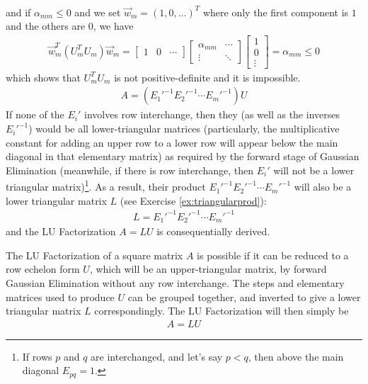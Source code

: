 {\begin{align*}
\end{align*}
and if $\alpha_{mm} \leq 0$ and we set $\vec{w}_{m} = (1,0,\ldots)^T$ where only the first component is $1$ and the others are $0$, we have
\begin{align*}
\vec{w}_{m}^T(U_m^T U_m)\vec{w}_{m} =
\begin{bmatrix}
1 & 0 & \cdots 
\end{bmatrix}
\begin{bmatrix}
\alpha_{mm} & \cdots \\
\vdots & \ddots
\end{bmatrix}
\begin{bmatrix}
1 \\
0 \\
\vdots
\end{bmatrix}
= \alpha_{mm} \leq 0
\end{align*}
which shows that $U_{m}^T U_{m}$ is not positive-definite and it is impossible.}
\begin{align}
A = (E_1'^{-1}E_2'^{-1}\cdots E_m'^{-1})U    
\end{align}
If none of the $E_i'$ involves row interchange, then they (as well as the inverses $E_i'^{-1}$) would be all lower-triangular matrices (particularly, the multiplicative constant for adding an upper row to a lower row will appear below the main diagonal in that elementary matrix) as required by the forward stage of Gaussian Elimination (meanwhile, if there is row interchange, then $E_i'$ will not be a lower triangular matrix)\footnote{If rows $p$ and $q$ are interchanged, and let's say $p < q$, then above the main diagonal $E_{pq} = 1$.}. As a result, their product $E_1'^{-1}E_2'^{-1}\cdots E_m'^{-1}$ will also be a lower triangular matrix $L$ (see Exercise \ref{ex:triangularprod}):
\begin{align}
L = E_1'^{-1}E_2'^{-1}\cdots E_m'^{-1}    
\end{align}
and the LU Factorization $A = LU$ is consequentially derived.
\begin{thm}[LU Factorization]
The LU Factorization of a square matrix $A$ is possible if it can be reduced to a row echelon form $U$, which will be an upper-triangular matrix, by forward Gaussian Elimination without any row interchange. The steps and elementary matrices used to produce $U$ can be grouped together, and inverted to give a lower triangular matrix $L$ correspondingly. The LU Factorization will then simply be
\begin{align}
A = LU   
\end{align}
\end{thm}

